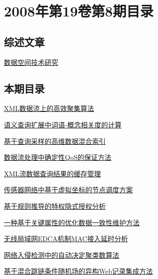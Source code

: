 \documentclass[a4paper]{article}
\begin{document}
\section{\textbf{2008年第19卷第8期目录}}
\subsection{综述文章}
\href{http://www.jos.org.cn/ch/reader/download_pdf.aspx?file_no=20080813&year_id=2008&quarter_id=8&falg=1}{数据空间技术研究}

\subsection{本期目录}
\href{http://www.jos.org.cn/ch/reader/download_pdf.aspx?file_no=20080814&year_id=2008&quarter_id=8&falg=1}{XML数据流上的高效聚集算法}

\href{http://www.jos.org.cn/ch/reader/download_pdf.aspx?file_no=20080815&year_id=2008&quarter_id=8&falg=1}{语义查询扩展中词语-概念相关度的计算}

\href{http://www.jos.org.cn/ch/reader/download_pdf.aspx?file_no=20080816&year_id=2008&quarter_id=8&falg=1}{基于查询采样的高维数据混合索引}

\href{http://www.jos.org.cn/ch/reader/download_pdf.aspx?file_no=20080817&year_id=2008&quarter_id=8&falg=1}{数据流处理中确定性QoS的保证方法}

\href{http://www.jos.org.cn/ch/reader/download_pdf.aspx?file_no=20080818&year_id=2008&quarter_id=8&falg=1}{XML流数据查询结果的缓存管理}

\href{http://www.jos.org.cn/ch/reader/download_pdf.aspx?file_no=20080819&year_id=2008&quarter_id=8&falg=1}{传感器网络中基于虚拟坐标的节点调度方案}

\href{http://www.jos.org.cn/ch/reader/download_pdf.aspx?file_no=20080820&year_id=2008&quarter_id=8&falg=1}{基于规则推导的特权隐式授权分析}

\href{http://www.jos.org.cn/ch/reader/download_pdf.aspx?file_no=20080821&year_id=2008&quarter_id=8&falg=1}{一种基于关键属性的优化数据一致性维护方法}

\href{http://www.jos.org.cn/ch/reader/download_pdf.aspx?file_no=20080822&year_id=2008&quarter_id=8&falg=1}{无线局域网EDCA机制MAC接入延时分析}

\href{http://www.jos.org.cn/ch/reader/download_pdf.aspx?file_no=20080823&year_id=2008&quarter_id=8&falg=1}{网络入侵检测中的自动决定聚类数算法}

\href{http://www.jos.org.cn/ch/reader/download_pdf.aspx?file_no=20080824&year_id=2008&quarter_id=8&falg=1}{基于混合跳链条件随机场的异构Web记录集成方法}
\end{document}
